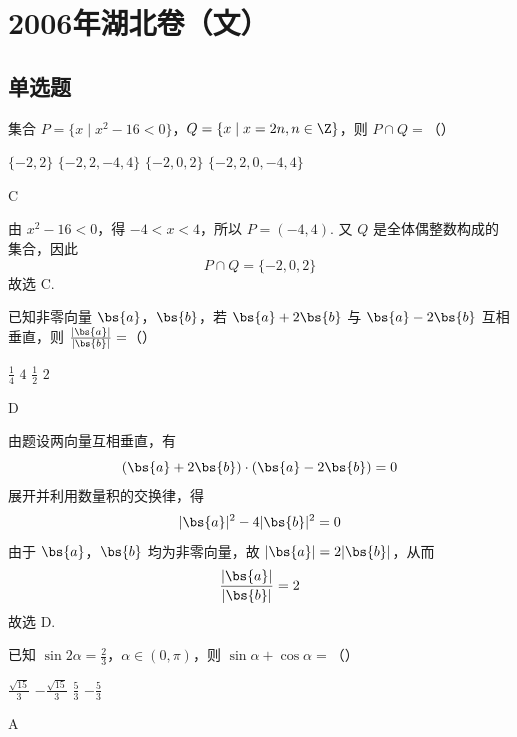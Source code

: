 \chapter{2006年湖北卷（文）}
\section{单选题}
\begin{problem}
集合 \(P = \{x \mid x^2 - 16 < 0\}\)，\(Q = \{x \mid x = 2n, n \in \Z\}\)，则 \(P \cap Q =\)（\quad）

\choices
    {\(\{-2, 2\}\)}
    {\(\{-2, 2, -4, 4\}\)}
    {\(\{-2, 0, 2\}\)}
    {\(\{-2, 2, 0, -4, 4\}\)}
\end{problem}

\begin{answer}
C
\end{answer}

\begin{solution}
由 \(x^2-16<0\)，得 \(-4<x<4\)，所以 \(P=(-4,4)\). 又 \(Q\) 是全体偶整数构成的集合，因此
\[
P\cap Q=\{-2,0,2\}
\]
故选 C.
\end{solution}

\begin{problem}
已知非零向量 \(\bs{a}\)，\(\bs{b}\)，若 \(\bs{a} + 2\bs{b}\) 与 \(\bs{a} - 2\bs{b}\) 互相垂直，则 \(\frac{|\bs{a}|}{|\bs{b}|} =\)（\quad）

\choices
    {\(\frac{1}{4}\)}
    {\(4\)}
    {\( \frac{1}{2} \)}
    {\(2\)}
\end{problem}

\begin{answer}
D
\end{answer}

\begin{solution}
由题设两向量互相垂直，有
\[
(\bs{a}+2\bs{b})\cdot(\bs{a}-2\bs{b})=0
\]
展开并利用数量积的交换律，得
\[
|\bs{a}|^2-4|\bs{b}|^2=0
\]
由于 \(\bs{a}\)，\(\bs{b}\) 均为非零向量，故 \(|\bs{a}|=2|\bs{b}|\)，从而
\[
\frac{|\bs{a}|}{|\bs{b}|}=2
\]
故选 D.
\end{solution}

\begin{problem}
已知 \(\sin 2\alpha = \frac{2}{3}\)，\(\alpha \in (0, \pi)\)，则 \(\sin \alpha + \cos \alpha =\)（\quad）

\choices
    {\(\frac{\sqrt{15}}{3}\)}
    {\(-\frac{\sqrt{15}}{3}\)}
    {\(\frac{5}{3}\)}
    {\(-\frac{5}{3}\)}
\end{problem}

\begin{answer}
A
\end{answer}

